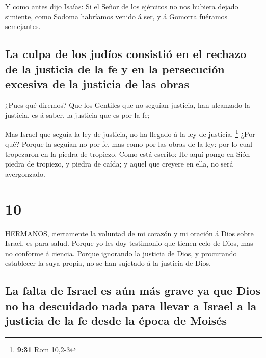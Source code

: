  Y como antes dijo Isaías: Si el Señor de los ejércitos no
nos hubiera dejado simiente, como Sodoma habríamos venido á ser, y á
Gomorra fuéramos semejantes.

\hypertarget{la-culpa-de-los-juduxedos-consistiuxf3-en-el-rechazo-de-la-justicia-de-la-fe-y-en-la-persecuciuxf3n-excesiva-de-la-justicia-de-las-obras}{%
\subsection{La culpa de los judíos consistió en el rechazo de la
justicia de la fe y en la persecución excesiva de la justicia de las
obras}\label{la-culpa-de-los-juduxedos-consistiuxf3-en-el-rechazo-de-la-justicia-de-la-fe-y-en-la-persecuciuxf3n-excesiva-de-la-justicia-de-las-obras}}

 ¿Pues qué diremos? Que los Gentiles que no seguían
justicia, han alcanzado la justicia, es á saber, la justicia que es por
la fe;

 Mas Israel que seguía la ley de justicia, no ha llegado á
la ley de justicia. \footnote{\textbf{9:31} Rom 10,2-3} 
¿Por qué? Porque la seguían no por fe, mas como por las obras de la ley:
por lo cual tropezaron en la piedra de tropiezo,  Como está
escrito: He aquí pongo en Sión piedra de tropiezo, y piedra de caída; y
aquel que creyere en ella, no será avergonzado.

\hypertarget{section-9}{%
\section{10}\label{section-9}}

 HERMANOS, ciertamente la voluntad de mi corazón y mi
oración á Dios sobre Israel, es para salud.  Porque yo les
doy testimonio que tienen celo de Dios, mas no conforme á ciencia.
 Porque ignorando la justicia de Dios, y procurando
establecer la suya propia, no se han sujetado á la justicia de Dios.

\hypertarget{la-falta-de-israel-es-auxfan-muxe1s-grave-ya-que-dios-no-ha-descuidado-nada-para-llevar-a-israel-a-la-justicia-de-la-fe-desde-la-uxe9poca-de-moisuxe9s}{%
\subsection{La falta de Israel es aún más grave ya que Dios no ha
descuidado nada para llevar a Israel a la justicia de la fe desde la
época de
Moisés}\label{la-falta-de-israel-es-auxfan-muxe1s-grave-ya-que-dios-no-ha-descuidado-nada-para-llevar-a-israel-a-la-justicia-de-la-fe-desde-la-uxe9poca-de-moisuxe9s}}

